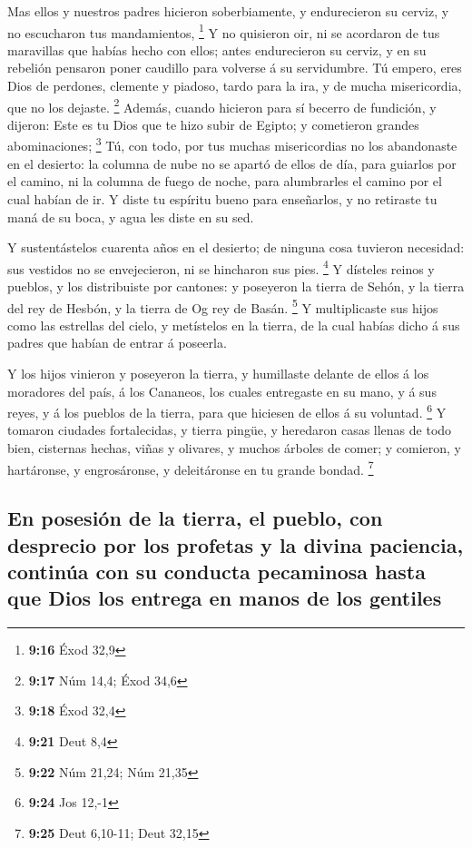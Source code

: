  Mas ellos y nuestros padres hicieron soberbiamente, y
endurecieron su cerviz, y no escucharon tus mandamientos, \footnote{\textbf{9:16}
  Éxod 32,9}  Y no quisieron oir, ni se acordaron de tus
maravillas que habías hecho con ellos; antes endurecieron su cerviz, y
en su rebelión pensaron poner caudillo para volverse á su servidumbre.
Tú empero, eres Dios de perdones, clemente y piadoso, tardo para la ira,
y de mucha misericordia, que no los dejaste. \footnote{\textbf{9:17} Núm
  14,4; Éxod 34,6}  Además, cuando hicieron para sí
becerro de fundición, y dijeron: Este es tu Dios que te hizo subir de
Egipto; y cometieron grandes abominaciones; \footnote{\textbf{9:18} Éxod
  32,4}  Tú, con todo, por tus muchas misericordias no
los abandonaste en el desierto: la columna de nube no se apartó de ellos
de día, para guiarlos por el camino, ni la columna de fuego de noche,
para alumbrarles el camino por el cual habían de ir.  Y
diste tu espíritu bueno para enseñarlos, y no retiraste tu maná de su
boca, y agua les diste en su sed.

 Y sustentástelos cuarenta años en el desierto; de
ninguna cosa tuvieron necesidad: sus vestidos no se envejecieron, ni se
hincharon sus pies. \footnote{\textbf{9:21} Deut 8,4}  Y
dísteles reinos y pueblos, y los distribuiste por cantones: y poseyeron
la tierra de Sehón, y la tierra del rey de Hesbón, y la tierra de Og rey
de Basán. \footnote{\textbf{9:22} Núm 21,24; Núm 21,35} 
Y multiplicaste sus hijos como las estrellas del cielo, y metístelos en
la tierra, de la cual habías dicho á sus padres que habían de entrar á
poseerla.

 Y los hijos vinieron y poseyeron la tierra, y humillaste
delante de ellos á los moradores del país, á los Cananeos, los cuales
entregaste en su mano, y á sus reyes, y á los pueblos de la tierra, para
que hiciesen de ellos á su voluntad. \footnote{\textbf{9:24} Jos 12,-1}
 Y tomaron ciudades fortalecidas, y tierra pingüe, y
heredaron casas llenas de todo bien, cisternas hechas, viñas y olivares,
y muchos árboles de comer; y comieron, y hartáronse, y engrosáronse, y
deleitáronse en tu grande bondad. \footnote{\textbf{9:25} Deut 6,10-11;
  Deut 32,15}

\hypertarget{en-posesiuxf3n-de-la-tierra-el-pueblo-con-desprecio-por-los-profetas-y-la-divina-paciencia-continuxfaa-con-su-conducta-pecaminosa-hasta-que-dios-los-entrega-en-manos-de-los-gentiles}{%
\subsection{En posesión de la tierra, el pueblo, con desprecio por los
profetas y la divina paciencia, continúa con su conducta pecaminosa
hasta que Dios los entrega en manos de los
gentiles}\label{en-posesiuxf3n-de-la-tierra-el-pueblo-con-desprecio-por-los-profetas-y-la-divina-paciencia-continuxfaa-con-su-conducta-pecaminosa-hasta-que-dios-los-entrega-en-manos-de-los-gentiles}}

